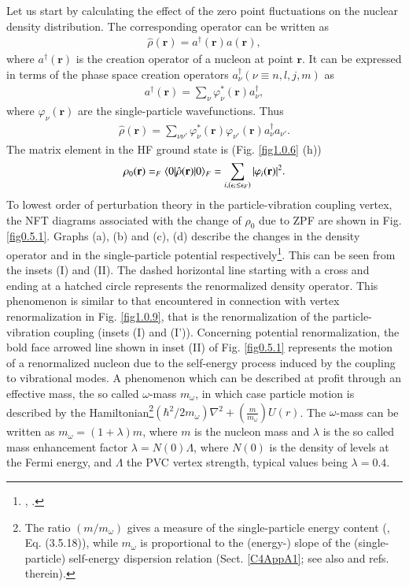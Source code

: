  Let us start by calculating the effect of the zero point fluctuations on the nuclear density distribution. The corresponding operator can be written as
\begin{align}\label{eq0.1.123}
\hat\rho(\mathbf r)=a^\dagger(\mathbf r)a(\mathbf r),
\end{align}
where $a^\dagger(\mathbf r)$ is the creation operator of a nucleon at point $\mathbf r$. It can be expressed in terms of the phase space creation operators $a^\dagger_\nu(\nu\equiv n,l,j,m)$ as
\begin{align}\label{eq0.1.124}
a^\dagger(\mathbf r)=\sum_\nu\varphi^*_\nu(\mathbf r) a^\dagger_\nu,
\end{align}
where $\varphi_\nu(\mathbf r)$ are the single-particle wavefunctions. Thus
\begin{align}\label{eq0.1.125}
\hat\rho(\mathbf r)=\sum_{\nu\nu'}\varphi^*_\nu(\mathbf r)\varphi_{\nu'}(\mathbf r)a^\dagger_\nu a_{\nu'}.
\end{align}
The matrix element in the HF ground state is (Fig. \ref{fig1.0.6} (h))
\begin{align}\label{eq0.1.126}
\rho_0(\mathbf r)=_F\langle {0|\hat\rho(\mathbf r)|0} \rangle_F=\sum_{i, (\epsilon_i\leq\epsilon_F)}|\varphi_i(\mathbf r)|^2.
\end{align}
To lowest order of perturbation theory in the particle-vibration coupling vertex, the NFT diagrams associated with the change of $\rho_0$ due to ZPF are shown in Fig. \ref{fig0.5.1}. Graphs (a),  (b) and (c), (d) describe the changes in the density operator and in the single-particle potential respectively\footnote{\cite{Barranco:85b}, \cite{Barranco:85}.}. This can be seen from the insets (I) and (II). The dashed horizontal line starting with a cross and ending at a hatched circle represents the renormalized density operator. This phenomenon is similar to that encountered in connection with vertex renormalization in Fig. \ref{fig1.0.9}, that is the renormalization of the particle-vibration coupling (insets (I) and (I')). Concerning potential renormalization, the bold face arrowed line shown in inset (II) of Fig. \ref{fig0.5.1} represents the motion of a renormalized nucleon due to the self-energy process induced by the coupling to vibrational modes. A phenomenon which can be described at profit through an effective mass, the so called $\omega$-mass $m_\omega$, in which case particle motion is described by the Hamiltonian\footnote{The ratio $(m/m_\omega)$ gives a measure of the single-particle energy content (\cite{Mahaux:85}, Eq. (3.5.18)), while $m_\omega$ is proportional to the (energy-) slope of the (single-particle) self-energy dispersion relation (Sect. \ref{C4AppA1}; see also  \cite{Brink:05} and refs. therein).}$\left(\hbar^2/2m_\omega\right)\nabla^2+\left(\frac{m}{m_\omega}\right)U(r)$. The $\omega$-mass can be written as $m_\omega=(1+\lambda)m$, where $m$ is the nucleon mass and $\lambda$ is the so called mass enhancement factor $\lambda=N(0)\Lambda$, where $N(0)$ is the density of levels at the Fermi energy, and $\Lambda$ the PVC vertex strength, typical values being $\lambda=0.4$.

